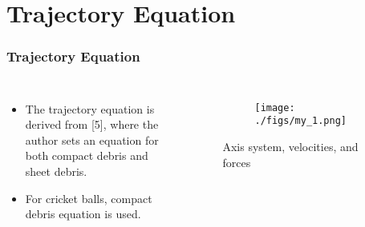 \documentclass{beamer}
\begin{document}
\section{Trajectory Equation}
\begin{frame}
\frametitle{Trajectory Equation}

\begin{columns}
  \begin{itemize}
  \item The trajectory equation is derived from [5], where the author sets an equation for both compact debris and sheet debris.
  \item For cricket balls, compact debris equation is used.
  
  
  \end{itemize}

\begin{figure}[h!]
  \centering
  \begin{subfigure}[b]{0.6\linewidth}
    \texttt{[image: ./figs/my\_1.png]}
  \end{subfigure}

  \caption{Axis system, velocities, and forces}
  \label{fig:axis}
\end{figure}
\end{columns}


\end{frame}
\end{document}
